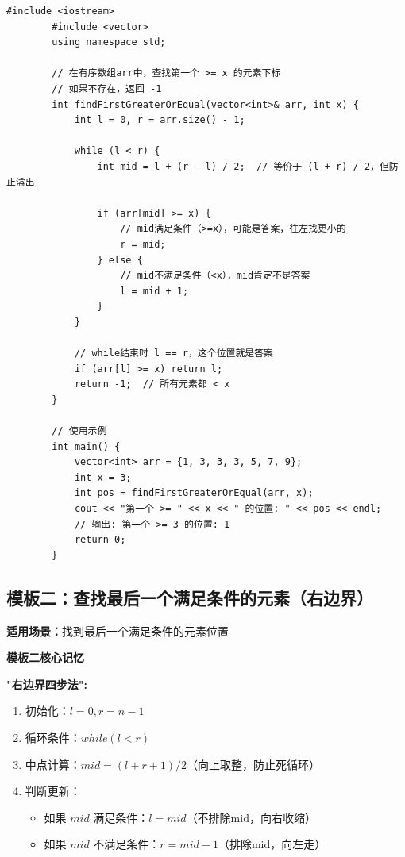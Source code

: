 \documentclass[12pt,a4paper]{article}
\begin{document}
	\begin{lstlisting}[caption={模板1：查找第一个 >= x 的元素}]
		#include <iostream>
		#include <vector>
		using namespace std;
		
		// 在有序数组arr中，查找第一个 >= x 的元素下标
		// 如果不存在，返回 -1
		int findFirstGreaterOrEqual(vector<int>& arr, int x) {
			int l = 0, r = arr.size() - 1;
			
			while (l < r) {
				int mid = l + (r - l) / 2;  // 等价于 (l + r) / 2，但防止溢出
				
				if (arr[mid] >= x) {
					// mid满足条件（>=x），可能是答案，往左找更小的
					r = mid;
				} else {
					// mid不满足条件（<x），mid肯定不是答案
					l = mid + 1;
				}
			}
			
			// while结束时 l == r，这个位置就是答案
			if (arr[l] >= x) return l;
			return -1;  // 所有元素都 < x
		}
		
		// 使用示例
		int main() {
			vector<int> arr = {1, 3, 3, 3, 5, 7, 9};
			int x = 3;
			int pos = findFirstGreaterOrEqual(arr, x);
			cout << "第一个 >= " << x << " 的位置: " << pos << endl;
			// 输出: 第一个 >= 3 的位置: 1
			return 0;
		}
	\end{lstlisting}
	
	\subsection{模板二：查找最后一个满足条件的元素（右边界）}
	
	\textbf{适用场景：}找到最后一个满足条件的元素位置
	
	\begin{orangebox}
		\textbf{模板二核心记忆}
		
		\textbf{"右边界四步法":}
		\begin{enumerate}
			\item 初始化：$l = 0, r = n - 1$
			\item 循环条件：$while(l < r)$
			\item 中点计算：$mid = (l + r + 1) / 2$（向上取整，防止死循环）
			\item 判断更新：
			\begin{itemize}
				\item 如果 $mid$ 满足条件：$l = mid$（不排除mid，向右收缩）
				\item 如果 $mid$ 不满足条件：$r = mid - 1$（排除mid，向左走）
			\end{itemize}
		\end{enumerate}
	\end{orangebox}
	
\end{document}
